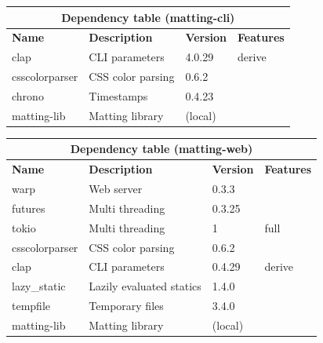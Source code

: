 \documentclass[a4paper]{article}
\begin{document}
\bgroup{}
\def\arraystretch{1.5}
\begin{center}
    \begin{tabular}{ |p{2cm}|p{4cm}|p{1.5cm}|p{2cm}| }
        \hline
        \multicolumn{4}{|c|}{\textbf{Dependency table (matting-cli)}} \\
        \hline
        \textbf{Name} & \textbf{Description} & \textbf{Version} & \textbf{Features} \\
        \hline
        clap & CLI parameters & 4.0.29 & derive \\
        \hline
        csscolorparser & CSS color parsing & 0.6.2 & \- \\
        \hline
        chrono & Timestamps & 0.4.23 & \- \\
        \hline
        matting-lib & Matting library & (local) & \- \\
        \hline
    \end{tabular}
\end{center}
\egroup{}

\bgroup{}
\def\arraystretch{1.5}
\begin{center}
    \begin{tabular}{ |p{2cm}|p{4cm}|p{1.5cm}|p{2cm}| }
        \hline
        \multicolumn{4}{|c|}{\textbf{Dependency table (matting-web)}} \\
        \hline
        \textbf{Name} & \textbf{Description} & \textbf{Version} & \textbf{Features} \\
        \hline
        warp & Web server & 0.3.3 & \- \\
        \hline
        futures & Multi threading & 0.3.25 & \- \\
        \hline
        tokio & Multi threading & 1 & full \\
        \hline
        csscolorparser & CSS color parsing & 0.6.2 & \- \\
        \hline
        clap & CLI parameters & 0.4.29 & derive \\
        \hline
        lazy\_static & Lazily evaluated statics & 1.4.0 & \- \\
        \hline
        tempfile & Temporary files & 3.4.0 & \- \\
        \hline
        matting-lib & Matting library & (local) & \- \\
        \hline
    \end{tabular}
\end{center}
\egroup{}

\pagebreak
\end{document}
